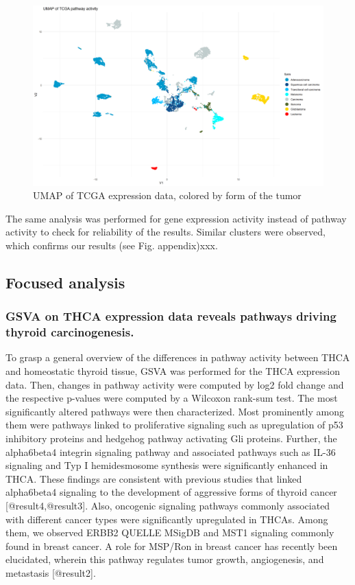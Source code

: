 \documentclass[
]{article}
\begin{document}
\begin{figure}

{\centering \includegraphics[width=0.5\linewidth]{figures/Pan Cancer UMAP cancer form} 

}

\caption{UMAP of TCGA expression data, colored by form of the tumor}\label{fig:UMAPPanForm}
\end{figure}

The same analysis was performed for gene expression activity instead of
pathway activity to check for reliability of the results. Similar
clusters were observed, which confirms our results (see Fig.
appendix)xxx.

\hypertarget{focused-analysis}{%
\subsection{Focused analysis}\label{focused-analysis}}

\hypertarget{gsva-on-thca-expression-data-reveals-pathways-driving-thyroid-carcinogenesis.}{%
\subsubsection{GSVA on THCA expression data reveals pathways driving
thyroid
carcinogenesis.}\label{gsva-on-thca-expression-data-reveals-pathways-driving-thyroid-carcinogenesis.}}

To grasp a general overview of the differences in pathway activity
between THCA and homeostatic thyroid tissue, GSVA was performed for the
THCA expression data. Then, changes in pathway activity were computed by
log2 fold change and the respective p-values were computed by a Wilcoxon
rank-sum test. The most significantly altered pathways were then
characterized. Most prominently among them were pathways linked to
proliferative signaling such as upregulation of p53 inhibitory proteins
and hedgehog pathway activating Gli proteins. Further, the alpha6beta4
integrin signaling pathway and associated pathways such as IL-36
signaling and Typ I hemidesmosome synthesis were significantly enhanced
in THCA. These findings are consistent with previous studies that linked
alpha6beta4 signaling to the development of aggressive forms of thyroid
cancer {[}@result4,@result3{]}. Also, oncogenic signaling pathways
commonly associated with different cancer types were significantly
upregulated in THCAs. Among them, we observed ERBB2 QUELLE MSigDB and
MST1 signaling commonly found in breast cancer. A role for MSP/Ron in
breast cancer has recently been elucidated, wherein this pathway
regulates tumor growth, angiogenesis, and metastasis {[}@result2{]}.
\end{document}
